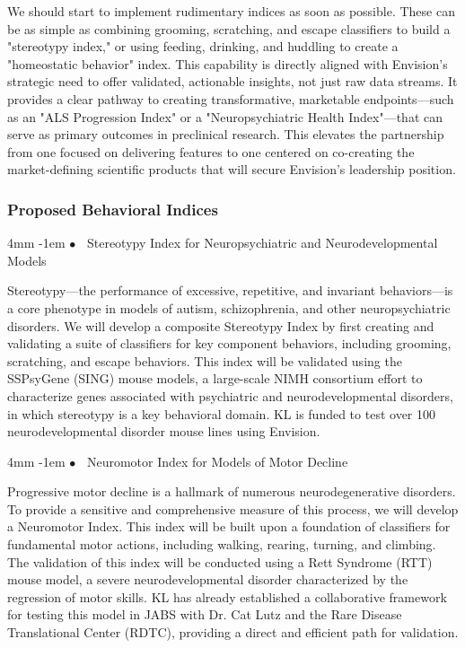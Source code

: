 \documentclass[11pt,onecolumn]{article}
\makeatletter
\renewcommand\paragraph{%
  \@startsection{paragraph}{4}{\z@}%
    {4mm}%
    {-1em}%
    {\normalfont\normalsize\bfseries$\bullet$~}%
}
\makeatother
\begin{document}
We should start to implement rudimentary indices as soon as possible. These can be as simple as combining grooming, scratching, and escape classifiers to build a "stereotypy index," or using feeding, drinking, and huddling to create a "homeostatic behavior" index. This capability is directly aligned with Envision's strategic need to offer validated, actionable insights, not just raw data streams. It provides a clear pathway to creating transformative, marketable endpoints—such as an "ALS Progression Index" or a "Neuropsychiatric Health Index"—that can serve as primary outcomes in preclinical research. This elevates the partnership from one focused on delivering features to one centered on co-creating the market-defining scientific products that will secure Envision's leadership position.

\subsubsection{Proposed Behavioral Indices}

\paragraph{Stereotypy Index for Neuropsychiatric and Neurodevelopmental Models}

Stereotypy—the performance of excessive, repetitive, and invariant behaviors—is a core phenotype in models of autism, schizophrenia, and other neuropsychiatric disorders. We will develop a composite Stereotypy Index by first creating and validating a suite of classifiers for key component behaviors, including grooming, scratching, and escape behaviors. This index will be validated using the SSPsyGene (SING) mouse models, a large-scale NIMH consortium effort to characterize genes associated with psychiatric and neurodevelopmental disorders, in which stereotypy is a key behavioral domain. KL is funded to test over 100 neurodevelopmental disorder mouse lines using Envision.

\paragraph{Neuromotor Index for Models of Motor Decline}

Progressive motor decline is a hallmark of numerous neurodegenerative disorders. To provide a sensitive and comprehensive measure of this process, we will develop a Neuromotor Index. This index will be built upon a foundation of classifiers for fundamental motor actions, including walking, rearing, turning, and climbing. The validation of this index will be conducted using a Rett Syndrome (RTT) mouse model, a severe neurodevelopmental disorder characterized by the regression of motor skills. KL has already established a collaborative framework for testing this model in JABS with Dr. Cat Lutz and the Rare Disease Translational Center (RDTC), providing a direct and efficient path for validation.
\end{document}
